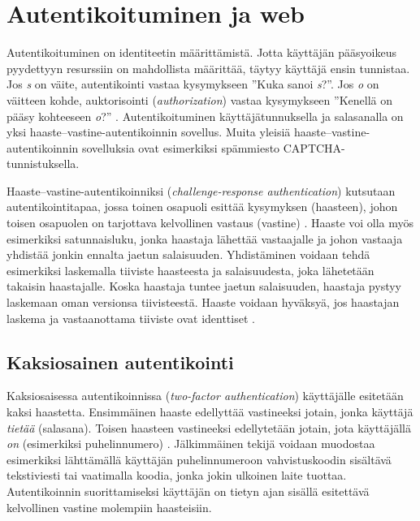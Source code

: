 \documentclass{tktltiki}
\begin{document}
\section{Autentikoituminen ja web}

Autentikoituminen on identiteetin määrittämistä. 
Jotta käyttäjän pääsyoikeus pyydettyyn resurssiin on mahdollista määrittää, täytyy käyttäjä ensin tunnistaa.
Jos \emph{s} on väite, autentikointi vastaa kysymykseen ''Kuka sanoi \emph{s}?''.
Jos \emph{o} on väitteen kohde, auktorisointi (\emph{authorization}) vastaa kysymykseen ''Kenellä on pääsy kohteeseen \emph{o}?'' \cite{lampson_distributed_1992}.
Autentikoituminen käyttäjätunnuksella ja salasanalla on yksi haaste--vastine-autentikoinnin sovellus. 
Muita yleisiä haaste--vastine-autentikoinnin sovelluksia ovat esimerkiksi spämmiesto CAPTCHA-tunnistuksella.

Haaste--vastine-autentikoinniksi (\emph{challenge-response authentication}) kutsutaan autentikointitapaa, jossa toinen osapuoli esittää kysymyksen (haasteen), johon toisen osapuolen on tarjottava kelvollinen vastaus (vastine) \cite{NIST_SP800-63}. Haaste voi olla myös esimerkiksi satunnaisluku, jonka haastaja lähettää vastaajalle ja johon vastaaja yhdistää jonkin ennalta jaetun salaisuuden. Yhdistäminen voidaan tehdä esimerkiksi laskemalla tiiviste haasteesta ja salaisuudesta, joka lähetetään takaisin haastajalle. Koska haastaja tuntee jaetun salaisuuden, haastaja pystyy laskemaan oman versionsa tiivisteestä. Haaste voidaan hyväksyä, jos haastajan laskema ja vastaanottama tiiviste ovat identtiset \cite{NIST_SP800-63}.



\subsection{Kaksiosainen autentikointi}

Kaksiosaisessa autentikoinnissa (\emph{two-factor authentication}) käyttäjälle esitetään kaksi haastetta. Ensimmäinen haaste edellyttää vastineeksi jotain, jonka käyttäjä \emph{tietää} (salasana). Toisen haasteen vastineeksi edellytetään jotain, jota käyttäjällä \emph{on} (esimerkiksi puhelinnumero) \cite{NIST_SP800-63, google_2step_2010}. Jälkimmäinen tekijä voidaan muodostaa esimerkiksi lähttämällä käyttäjän puhelinnumeroon vahvistuskoodin sisältävä tekstiviesti tai vaatimalla koodia, jonka jokin ulkoinen laite tuottaa. Autentikoinnin suorittamiseksi käyttäjän on tietyn ajan sisällä esitettävä kelvollinen vastine molempiin haasteisiin.
\end{document}
